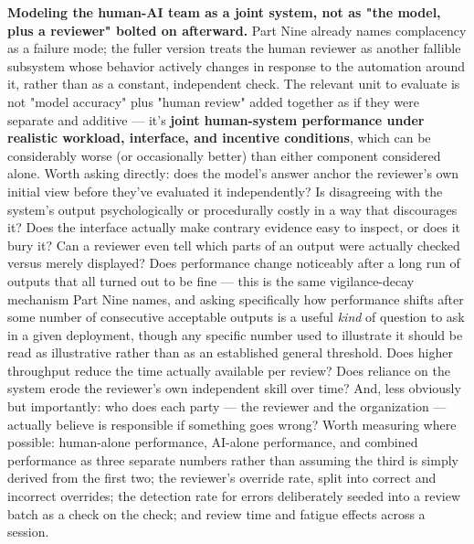 \textbf{Modeling the human-AI team as a joint system, not as "the model, plus a reviewer" bolted on afterward.} Part Nine already names complacency as a failure mode; the fuller version treats the human reviewer as another fallible subsystem whose behavior actively changes in response to the automation around it, rather than as a constant, independent check. The relevant unit to evaluate is not "model accuracy" plus "human review" added together as if they were separate and additive --- it's \textbf{joint human-system performance under realistic workload, interface, and incentive conditions}, which can be considerably worse (or occasionally better) than either component considered alone. Worth asking directly: does the model's answer anchor the reviewer's own initial view before they've evaluated it independently? Is disagreeing with the system's output psychologically or procedurally costly in a way that discourages it? Does the interface actually make contrary evidence easy to inspect, or does it bury it? Can a reviewer even tell which parts of an output were actually checked versus merely displayed? Does performance change noticeably after a long run of outputs that all turned out to be fine --- this is the same vigilance-decay mechanism Part Nine names, and asking specifically how performance shifts after some number of consecutive acceptable outputs is a useful \emph{kind} of question to ask in a given deployment, though any specific number used to illustrate it should be read as illustrative rather than as an established general threshold. Does higher throughput reduce the time actually available per review? Does reliance on the system erode the reviewer's own independent skill over time? And, less obviously but importantly: who does each party --- the reviewer and the organization --- actually believe is responsible if something goes wrong? Worth measuring where possible: human-alone performance, AI-alone performance, and combined performance as three separate numbers rather than assuming the third is simply derived from the first two; the reviewer's override rate, split into correct and incorrect overrides; the detection rate for errors deliberately seeded into a review batch as a check on the check; and review time and fatigue effects across a session.

